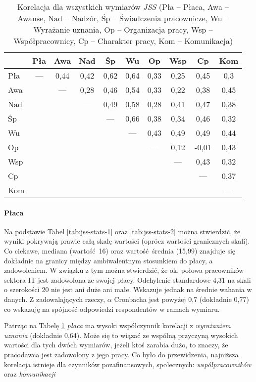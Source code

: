 \begin{table}[h!]
\begin{center}
\begin{tabular} { l | c c c c c c c c c }
 & Pła & Awa & Nad & Śp & Wu & Op & Wsp & Cp & Kom \\ \hline \hline
Pła & --- & 0,44 & 0,42 & 0,62 & 0,64 & 0,33 & 0,25 & 0,45 & 0,3 \\
Awa & & --- & 0,28 & 0,46 & 0,54 & 0,33 & 0,22 & 0,38 & 0,45 \\
Nad & & & --- & 0,49 & 0,58 & 0,28 & 0,41 & 0,47 & 0,38 \\
Śp & & & & --- & 0,66 & 0,38 & 0,34 & 0,46 & 0,32 \\
Wu & & & & & --- & 0,43 & 0,49 & 0,49 & 0,44 \\
Op & & & & & & --- & 0,12 & -0,01 & 0,43 \\
Wsp & & & & & & & --- & 0,43 & 0,32 \\
Cp & & & & & & & & --- & 0,37 \\
Kom & & & & & & & & & ---  \\
\end{tabular}
\end{center}
\caption[Korelacja dla wszystkich wymiarów \emph{JSS}]{Korelacja dla wszystkich wymiarów \emph{JSS} (Pła -- Płaca, Awa -- Awanse, Nad -- Nadzór, Śp -- Świadczenia pracownicze, Wu -- Wyrażanie uznania, Op -- Organizacja pracy, Wsp -- Współpracownicy, Cp -- Charakter pracy, Kom -- Komunikacja)}
\label{tab:jss-correl}
\end{table}

\paragraph{Płaca} Na podstawie Tabel \ref{tab:jss-stats-1} oraz \ref{tab:jss-stats-2} można stwierdzić, że wyniki pokrywają prawie całą skalę wartości (oprócz wartości granicznych skali). Co ciekawe, mediana (wartość 16) oraz wartość średnia (15,99) znajduje się dokładnie na granicy między ambiwalentnym stosunkiem do płacy, a zadowoleniem. W związku z tym można stwierdzić, że ok. połowa pracowników sektora IT jest zadowolona ze swojej płacy. Odchylenie standardowe 4,31 na
skali o szerokości 20 nie jest ani duże ani małe. Wskazuje
jednak na średnie wahania w danych. Z zadowalających rzeczy, $\alpha$ Cronbacha jest powyżej 0,7 (dokładnie 0,77) co wskazuję na spójność odpowiedzi respondentów w ramach wymiaru.

Patrząc na Tabelę \ref{tab:jss-correl} \textit{płaca} ma wysoki współczynnik korelacji z \textit{wyrażaniem uznania} (dokładnie 0,64). Może się to wiązać ze wspólną przyczyną wysokich wartości dla tych dwóch wymiarów, jeżeli ktoś zarabia dużo, to znaczy, że pracodawca jest zadowolony z jego pracy. Co było do przewidzenia, najniższa korelacja istnieje dla czynników pozafinansowych, społecznych: \emph{współpracowników} oraz \emph{komunikacji}

